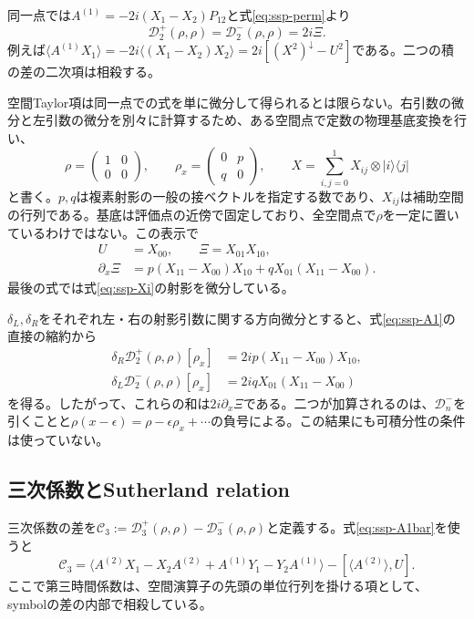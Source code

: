 同一点では$A^{(1)}=-2i(X_1-X_2)P_{12}$と式\eqref{eq:ssp-perm}より
\begin{equation}
\mathcal D_2^+(\rho,\rho)=\mathcal D_2^-(\rho,\rho)=2i\Xi.
\label{eq:ssp-D2}
\end{equation}
例えば$\langle A^{(1)}X_1\rangle=-2i\langle(X_1-X_2)X_2\rangle
=2i[(X^2)^\downarrow-U^2]$である。二つの積の差の二次項は相殺する。

空間Taylor項は同一点での式を単に微分して得られるとは限らない。右引数の微分と左引数の微分を別々に計算するため、ある空間点で定数の物理基底変換を行い、
\begin{equation}
\rho=\begin{pmatrix}1&0\\0&0\end{pmatrix},\qquad
\rho_x=\begin{pmatrix}0&p\\q&0\end{pmatrix},\qquad
X=\sum_{i,j=0}^1 X_{ij}\otimes|i\rangle\langle j|
\label{eq:ssp-blocks}
\end{equation}
と書く。$p,q$は複素射影の一般の接ベクトルを指定する数であり、$X_{ij}$は補助空間の行列である。基底は評価点の近傍で固定しており、全空間点で$\rho$を一定に置いているわけではない。この表示で
\begin{align}
U&=X_{00},\qquad \Xi=X_{01}X_{10},\\
\partial_x\Xi&=p(X_{11}-X_{00})X_{10}
+qX_{01}(X_{11}-X_{00}).\label{eq:ssp-Xix-block}
\end{align}
最後の式では式\eqref{eq:ssp-Xi}の射影を微分している。

$\delta_L,\delta_R$をそれぞれ左・右の射影引数に関する方向微分とすると、式\eqref{eq:ssp-A1}の直接の縮約から
\begin{align}
\delta_R\mathcal D_2^+(\rho,\rho)[\rho_x]
&=2ip(X_{11}-X_{00})X_{10},\\
\delta_L\mathcal D_2^-(\rho,\rho)[\rho_x]
&=2iqX_{01}(X_{11}-X_{00})
\end{align}
を得る。したがって、これらの和は$2i\partial_x\Xi$である。二つが加算されるのは、$\mathcal D^-_n$を引くことと$\rho(x-\epsilon)=\rho-\epsilon\rho_x+\cdots$の負号による。この結果にも可積分性の条件は使っていない。

\subsection{三次係数とSutherland relation}

三次係数の差を$\mathcal C_3:=\mathcal D_3^+(\rho,\rho)-\mathcal D_3^-(\rho,\rho)$と定義する。式\eqref{eq:ssp-A1bar}を使うと
\begin{equation}
\mathcal C_3=\langle A^{(2)}X_1-X_2A^{(2)}
+A^{(1)}Y_1-Y_2A^{(1)}\rangle-[\langle A^{(2)}\rangle,U].
\label{eq:ssp-C3start}
\end{equation}
ここで第三時間係数は、空間演算子の先頭の単位行列を掛ける項として、symbolの差の内部で相殺している。

